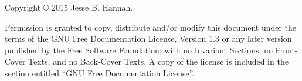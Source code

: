 \vspace*{\fill}
\begin{center}
Copyright \copyright{} 2015 Jesse B. Hannah.

Permission is granted to copy, distribute and/or modify this document under the
terms of the GNU Free Documentation License, Version 1.3 or any later version
published by the Free Software Foundation; with no Invariant Sections, no
Front-Cover Texts, and no Back-Cover Texts. A copy of the license is included
in the section entitled ``GNU Free Documentation License''.
\end{center}
\vspace*{\fill}
